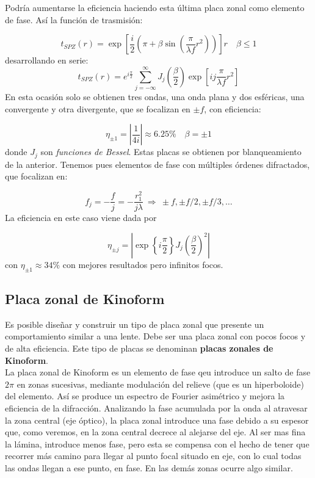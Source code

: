 \documentclass[12pt,a4paper]{book}
\numberwithin{equation}{section}
\numberwithin{figure}{section}
\newcommand{\parentesis}[1]{\left( #1  \right)}
\newcommand{\ccorchetes}[1]{\left[ #1  \right]}
\newcommand{\1}{_{(1)}}
\newcommand{\2}{_{(2)}}
\theoremstyle{definition}
\begin{document}
Podría aumentarse la eficiencia haciendo esta última placa zonal como elemento de fase. Así la función de trasmisión:

\begin{equation}
    t_{SPZ} (r) = \exp \ccorchetes{ \frac{i}{2} \parentesis{\pi+\beta \sin \parentesis{\frac{\pi}{\lambda f} r^2}}}r \quad \beta \leq 1
\end{equation}
desarrollando en serie:
\begin{equation}
    t_{SPZ} (r) = e^{i \frac{\pi}{2}} \sum_{j = - \infty}^{\infty}  J_j \parentesis{\frac{\beta}{2}} \exp\ccorchetes{i j \frac{\pi}{\lambda f} r^2}
\end{equation}
En esta ocasión solo se obtienen tres ondas, una onda plana y dos esféricas, una convergente y otra divergente, que se focalizan en $\pm f$, con eficiencia:

\begin{equation}
    \eta_{\pm 1} = \left| \frac{1}{4i} \right| \approx 6.25 \% \quad \beta=\pm 1
\end{equation}
donde $J_j$ son \textit{funciones de Bessel}. Estas placas se obtienen por blanqueamiento de la anterior. Tenemos pues elementos de fase con múltiples órdenes difractados, que focalizan en:

\begin{equation}
    f_j = - \frac{f}{j} = - \frac{r_1^2}{j \lambda} \ \Rightarrow \ \pm f, \pm f/2, \pm f/3, \ldots
\end{equation}
La eficiencia en este caso viene dada por

\begin{equation}
    \eta_{\pm j} = \left| \exp \left\lbrace i\frac{\pi}{2} \right\rbrace J_j \parentesis{\frac{\beta}{2}}^2 \right| 
\end{equation}
con $\eta_{\pm 1} \approx 34 \%$ con mejores resultados pero infinitos focos.

\subsection{Placa zonal de Kinoform}

Es posible diseñar y construir un tipo de placa zonal que presente un comportamiento similar a una lente. Debe ser una placa zonal con pocos focos y de alta eficiencia.  Este tipo de placas se denominan \textbf{placas zonales de Kinoform}. \\

La placa zonal de Kinoform es un elemento de fase qeu introduce un salto de fase $2\pi$ en zonas sucesivas, mediante modulación del relieve (que es un hiperboloide) del elemento. Así se produce un espectro de Fourier asimétrico y mejora la eficiencia de la difracción. Analizando la fase acumulada por la onda al atravesar la zona central (eje óptico), la placa zonal introduce una fase debido a su espesor que, como veremos, en la zona central decrece al alejarse del eje. Al ser mas fina la lámina, introduce menos fase, pero esta se compensa con el hecho de tener que recorrer más camino para llegar al punto focal situado en eje, con lo cual todas las ondas llegan a ese punto, en fase. En las demás zonas ocurre algo similar. \\
\end{document}
